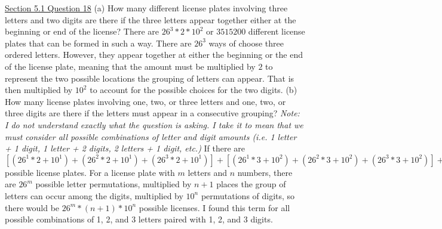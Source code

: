 \documentclass{article}
\begin{document}
\underline{Section 5.1 Question 18}\newline{}
(a) How many different license plates involving three letters and two digits are
there if the three letters appear together either at the beginning or end of the
license?\newline{}
There are $26^3*2*10^2$ or $3515200$ different license plates that can be formed in such a way. There are $26^3$ ways of choose three ordered letters. However, they appear together at either the beginning or the end of the license plate, meaning that the amount must be multiplied by $2$ to represent the two possible locations the grouping of letters can appear. That is then multiplied by $10^2$ to account for the possible choices for the two digits.\newline{}\newline{}
(b) How many license plates involving one, two, or three letters and one,
two, or three digits are there if the letters must appear in a consecutive
grouping?\newline{}
\textit{Note: I do not understand exactly what the question is asking. I take it to mean that we must consider all possible combinations of letter and digit amounts (i.e. 1 letter + 1 digit, 1 letter + 2 digits, 2 letters + 1 digit, etc.)}\newline{}
If there are $[(26^1*2+10^1)+(26^2*2+10^1)+(26^3*2+10^1)]+[(26^1*3+10^2)+(26^2*3+10^2)+(26^3*3+10^2)]+[(26^1*4+10^3)+(26^2*4+10^3)+(26^3*4+10^3)]$ possible license plates. For a license plate with $m$ letters and $n$ numbers, there are $26^m$ possible letter permutations, multiplied by $n+1$ places the group of letters can occur among the digits, multiplied by $10^n$ permutations of digits, so there would be $26^m*(n+1)*10^n$ possible licenses. I found this term for all possible combinations of 1, 2, and 3 letters paired with 1, 2, and 3 digits.\newline{}\newline{}
\end{document}
